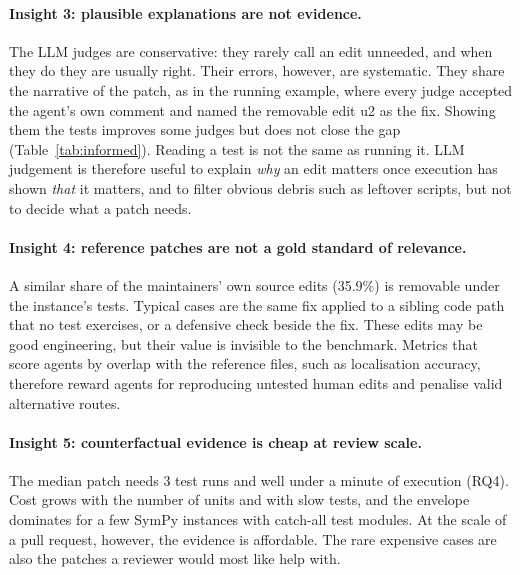 \documentclass[a4paper,fleqn]{cas-sc}
\newcommand{\rqfourCallsMedian}{3}
\newcommand{\rqtwoGoldSrcUnneeded}{35.9\%}
\begin{document}
\paragraph{Insight 3: plausible explanations are not evidence.} The LLM judges are conservative: they rarely call an edit unneeded, and when they do they are usually right. Their errors, however, are systematic. They share the narrative of the patch, as in the running example, where every judge accepted the agent's own comment and named the removable edit u2 as the fix. Showing them the tests improves some judges but does not close the gap (Table~\ref{tab:informed}). Reading a test is not the same as running it. LLM judgement is therefore useful to explain \emph{why} an edit matters once execution has shown \emph{that} it matters, and to filter obvious debris such as leftover scripts, but not to decide what a patch needs.

\paragraph{Insight 4: reference patches are not a gold standard of relevance.} A similar share of the maintainers' own source edits (\rqtwoGoldSrcUnneeded{}) is removable under the instance's tests. Typical cases are the same fix applied to a sibling code path that no test exercises, or a defensive check beside the fix. These edits may be good engineering, but their value is invisible to the benchmark. Metrics that score agents by overlap with the reference files, such as localisation accuracy, therefore reward agents for reproducing untested human edits and penalise valid alternative routes.

\paragraph{Insight 5: counterfactual evidence is cheap at review scale.} The median patch needs \rqfourCallsMedian{} test runs and well under a minute of execution (RQ4). Cost grows with the number of units and with slow tests, and the envelope dominates for a few SymPy instances with catch-all test modules. At the scale of a pull request, however, the evidence is affordable. The rare expensive cases are also the patches a reviewer would most like help with.
\end{document}
